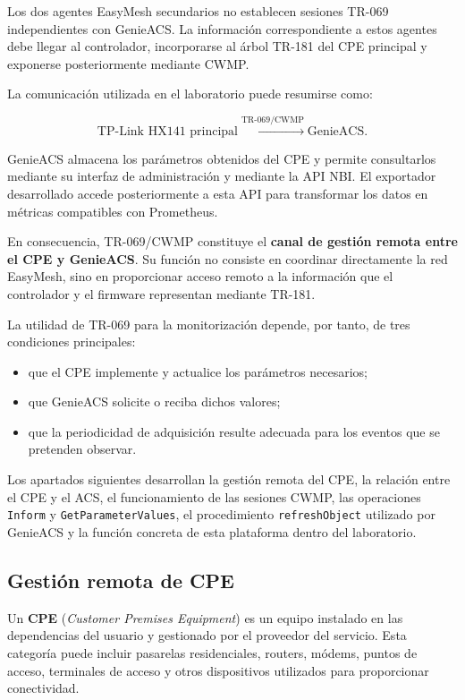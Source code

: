 Los dos agentes EasyMesh secundarios no establecen sesiones TR-069
independientes con GenieACS. La información correspondiente a estos
agentes debe llegar al controlador, incorporarse al árbol TR-181 del CPE
principal y exponerse posteriormente mediante CWMP.

La comunicación utilizada en el laboratorio puede resumirse como:

\[
    \text{TP-Link HX141 principal}
    \overset{\text{TR-069/CWMP}}{\longleftrightarrow}
    \text{GenieACS}.
\]

GenieACS almacena los parámetros obtenidos del CPE y permite consultarlos
mediante su interfaz de administración y mediante la API NBI. El
exportador desarrollado accede posteriormente a esta API para transformar
los datos en métricas compatibles con Prometheus.

En consecuencia, TR-069/CWMP constituye el
\textbf{canal de gestión remota entre el CPE y GenieACS}. Su función no
consiste en coordinar directamente la red EasyMesh, sino en proporcionar
acceso remoto a la información que el controlador y el firmware
representan mediante TR-181.

La utilidad de TR-069 para la monitorización depende, por tanto, de tres
condiciones principales:

\begin{itemize}
    \item que el CPE implemente y actualice los parámetros necesarios;
    \item que GenieACS solicite o reciba dichos valores;
    \item que la periodicidad de adquisición resulte adecuada para los
    eventos que se pretenden observar.
\end{itemize}

Los apartados siguientes desarrollan la gestión remota del CPE, la
relación entre el CPE y el ACS, el funcionamiento de las sesiones CWMP,
las operaciones \texttt{Inform} y
\texttt{GetParameterValues}, el procedimiento
\texttt{refreshObject} utilizado por GenieACS y la función concreta de
esta plataforma dentro del laboratorio.

\subsection{Gestión remota de CPE}
\label{subsec:gestion-remota-cpe}

Un \textbf{CPE} (\textit{Customer Premises Equipment}) es un equipo
instalado en las dependencias del usuario y gestionado por el proveedor
del servicio. Esta categoría puede incluir pasarelas residenciales,
routers, módems, puntos de acceso, terminales de acceso y otros
dispositivos utilizados para proporcionar conectividad.

